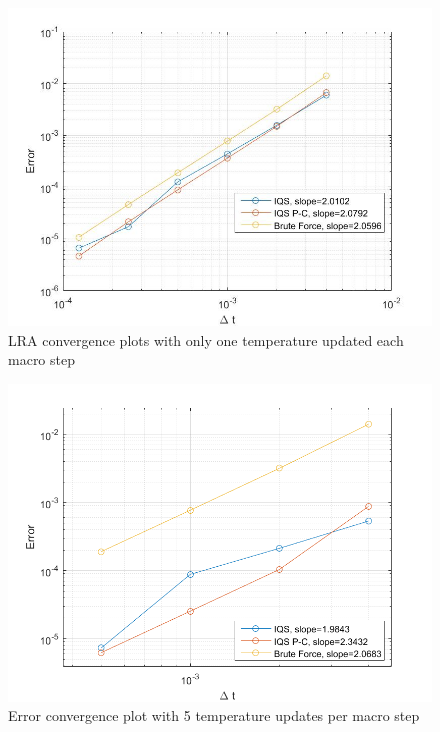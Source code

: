 \documentclass{anstrans}
\begin{document}
\begin{figure}[!htpb]
\includegraphics[width=\linewidth]{lra_bad.jpg}
\caption{LRA convergence plots with only one temperature updated each macro step}
\label{fig:lra_bad}
\end{figure}

\begin{figure}[htbp!]
\centering
\includegraphics[width=\linewidth]{lra_mp_convergence.png}
\caption{Error convergence plot with 5 temperature updates per macro step}
\label{fig:conv}
\end{figure}
\end{document}
